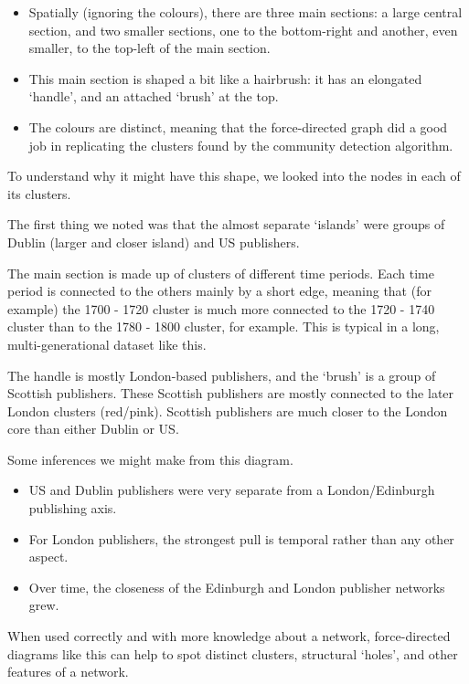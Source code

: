 \documentclass[
]{book}
\begin{document}
\begin{itemize}
\item
  Spatially (ignoring the colours), there are three main sections: a large central section, and two smaller sections, one to the bottom-right and another, even smaller, to the top-left of the main section.
\item
  This main section is shaped a bit like a hairbrush: it has an elongated `handle', and an attached `brush' at the top.
\item
  The colours are distinct, meaning that the force-directed graph did a good job in replicating the clusters found by the community detection algorithm.
\end{itemize}

To understand why it might have this shape, we looked into the nodes in each of its clusters.

The first thing we noted was that the almost separate `islands' were groups of Dublin (larger and closer island) and US publishers.

The main section is made up of clusters of different time periods. Each time period is connected to the others mainly by a short edge, meaning that (for example) the 1700 - 1720 cluster is much more connected to the 1720 - 1740 cluster than to the 1780 - 1800 cluster, for example. This is typical in a long, multi-generational dataset like this.

The handle is mostly London-based publishers, and the `brush' is a group of Scottish publishers. These Scottish publishers are mostly connected to the later London clusters (red/pink). Scottish publishers are much closer to the London core than either Dublin or US.

Some inferences we might make from this diagram.

\begin{itemize}
\item
  US and Dublin publishers were very separate from a London/Edinburgh publishing axis.
\item
  For London publishers, the strongest pull is temporal rather than any other aspect.
\item
  Over time, the closeness of the Edinburgh and London publisher networks grew.
\end{itemize}

When used correctly and with more knowledge about a network, force-directed diagrams like this can help to spot distinct clusters, structural `holes', and other features of a network.
\end{document}
